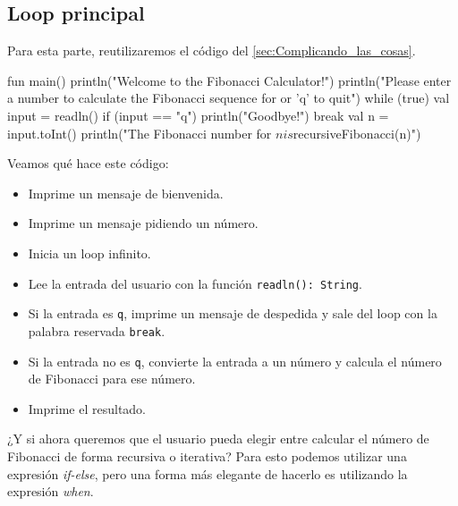 \subsection{Loop principal}
  Para esta parte, reutilizaremos el código del \cref{sec:Complicando_las_cosas}.

  \begin{kotlin}
    fun main() {
      println("Welcome to the Fibonacci Calculator!")
      println("Please enter a number to calculate the Fibonacci sequence for or 'q' to quit")
      while (true) {
        val input = readln()
        if (input == "q") {
          println("Goodbye!")
          break
        }
        val n = input.toInt()
        println("The Fibonacci number for $n is ${recursiveFibonacci(n)}")
      }
    }
  \end{kotlin}

  Veamos qué hace este código:
  \begin{itemize}
    \item Imprime un mensaje de bienvenida.
    \item Imprime un mensaje pidiendo un número.
    \item Inicia un loop infinito.
    \item Lee la entrada del usuario con la función \texttt{readln(): String}.
    \item Si la entrada es \texttt{q}, imprime un mensaje de despedida y sale del loop con la 
      palabra reservada \texttt{break}.
    \item Si la entrada no es \texttt{q}, convierte la entrada a un número y calcula el número de 
      Fibonacci para ese número.
    \item Imprime el resultado.
  \end{itemize}

  ¿Y si ahora queremos que el usuario pueda elegir entre calcular el número de Fibonacci de forma
  recursiva o iterativa?
  Para esto podemos utilizar una expresión \textit{if-else}, pero una forma más elegante de hacerlo
  es utilizando la expresión \textit{when}.


